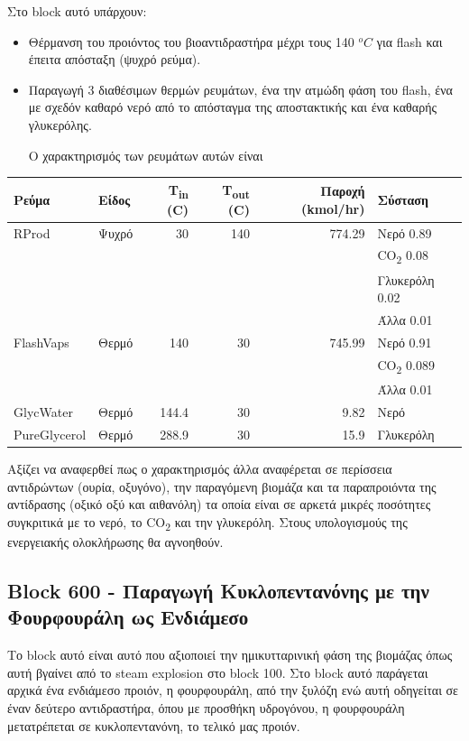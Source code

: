 \documentclass[11pt]{article}
\begin{document}
Στο block αυτό υπάρχουν:
\begin{itemize}
\item Θέρμανση του προιόντος του βιοαντιδραστήρα μέχρι τους 140 \(^oC\) για flash και έπειτα απόσταξη (ψυχρό ρεύμα).
\item Παραγωγή 3 διαθέσιμων θερμών ρευμάτων, ένα την ατμώδη φάση του flash, ένα με σχεδόν καθαρό νερό από το απόσταγμα της αποστακτικής και ένα καθαρής γλυκερόλης.

Ο χαρακτηρισμός των ρευμάτων αυτών είναι
\end{itemize}
\begin{center}
\begin{tabular}{llrrrl}
Ρεύμα & Είδος & Τ\textsubscript{in} (C) & Τ\textsubscript{out} (C) & Παροχή (kmol/hr) & Σύσταση\\
\hline
RProd & Ψυχρό & 30 & 140 & 774.29 & Νερό 0.89\\
 &  &  &  &  & CO\textsubscript{2} 0.08\\
 &  &  &  &  & Γλυκερόλη 0.02\\
 &  &  &  &  & Άλλα 0.01\\
\hline
FlashVaps & Θερμό & 140 & 30 & 745.99 & Νερό 0.91\\
 &  &  &  &  & CO\textsubscript{2} 0.089\\
 &  &  &  &  & Άλλα 0.01\\
\hline
GlycWater & Θερμό & 144.4 & 30 & 9.82 & Νερό\\
\hline
PureGlycerol & Θερμό & 288.9 & 30 & 15.9 & Γλυκερόλη\\
\hline
\end{tabular}
\end{center}

Αξίζει να αναφερθεί πως ο χαρακτηρισμός άλλα αναφέρεται σε περίσσεια αντιδρώντων (ουρία, οξυγόνο), την παραγόμενη βιομάζα και τα παραπροιόντα της αντίδρασης (οξικό οξύ και αιθανόλη) τα οποία είναι σε αρκετά μικρές ποσότητες συγκριτικά με το νερό, το CO\textsubscript{2} και την γλυκερόλη. Στους υπολογισμούς της ενεργειακής ολοκλήρωσης θα αγνοηθούν.

\subsection{Block 600 - Παραγωγή Κυκλοπεντανόνης με την Φουρφουράλη ως Ενδιάμεσο}
\label{sec:org6f82726}
Το block αυτό είναι αυτό που αξιοποιεί την ημικυτταρινική φάση της βιομάζας όπως αυτή βγαίνει από το steam explosion στο block 100. Στο block αυτό παράγεται αρχικά ένα ενδιάμεσο προιόν, η φουρφουράλη, από την ξυλόζη ενώ αυτή οδηγείται σε έναν δεύτερο αντιδραστήρα, όπου με προσθήκη υδρογόνου, η φουρφουράλη μετατρέπεται σε κυκλοπεντανόνη, το τελικό μας προιόν.
\end{document}
